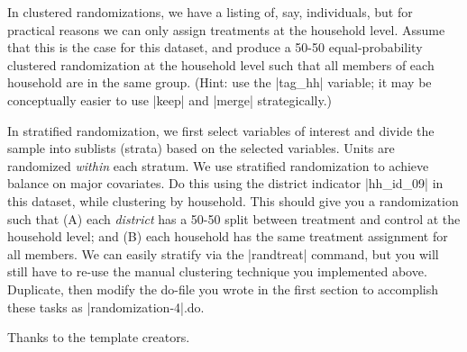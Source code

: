 \documentclass{tufte-handout}
\begin{document}
In clustered randomizations, we have a listing of, say, individuals,
but for practical reasons we can only assign treatments at the household level.
Assume that this is the case for this dataset,
and produce a 50-50 equal-probability clustered randomization
at the household level
such that all members of each household are in the same group.
(Hint: use the |tag_hh| variable;
it may be conceptually easier to use |keep| and |merge| strategically.)

In stratified randomization,
we first select variables of interest
and divide the sample into sublists (strata) based on the selected variables.
Units are randomized \textit{within} each stratum.
We use stratified randomization to achieve balance on major covariates.
Do this using the district indicator |hh_id_09| in this dataset,
while clustering by household.
This should give you a randomization such that
(A) each \textit{district} has a 50-50 split
between treatment and control at the household level;
and (B) each household has the same treatment assignment for all members.
We can easily stratify via the |randtreat| command,
but you will still have to re-use the manual clustering technique you implemented above.
Duplicate, then modify the do-file you wrote in the first section to accomplish these tasks as |randomization-4|.do.

Thanks to the template creators.\cite{tuftelatex}




\newpage

\begin{figure}[h]
{
}
\end{figure}

\begin{figure}[h]
{
}
\end{figure}

\begin{figure}[h]
{
}
\end{figure}

\begin{figure}[h]
{
}
\end{figure}
\end{document}
